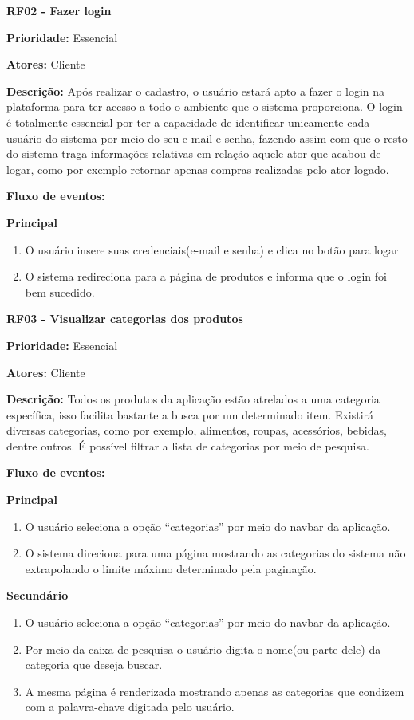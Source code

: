 \begin{apendicesenv}
\textbf{RF02 - Fazer login} \par
\textbf{Prioridade:} Essencial \par
\textbf{Atores:} Cliente \par
\textbf{Descrição:} Após realizar o cadastro, o usuário estará apto a fazer o login na plataforma para ter acesso a todo o ambiente que o sistema proporciona. O login é totalmente essencial por ter a capacidade de identificar unicamente cada usuário do sistema por meio do seu e-mail e senha, fazendo assim com que o resto do sistema traga informações relativas em relação aquele ator que acabou de logar, como por exemplo retornar apenas compras realizadas pelo ator logado. \par
\textbf{Fluxo de eventos:} \par
\textbf{Principal} \par
\begin{enumerate}
  \item O usuário insere suas credenciais(e-mail e senha) e clica no botão para logar
  \item O sistema redireciona para a página de produtos e informa que o login foi bem sucedido.
\end{enumerate}

\textbf{RF03 - Visualizar categorias dos produtos} \par
\textbf{Prioridade:} Essencial \par
\textbf{Atores:} Cliente \par
\textbf{Descrição:} Todos os produtos da aplicação estão atrelados a uma categoria específica, isso facilita bastante a busca por um determinado item. Existirá diversas categorias, como por exemplo, alimentos, roupas, acessórios, bebidas, dentre outros. É possível filtrar a lista de categorias por meio de pesquisa. \par
\textbf{Fluxo de eventos:} \par
\textbf{Principal} \par
\begin{enumerate}
  \item O usuário seleciona a opção “categorias” por meio do navbar da aplicação.
  \item O sistema direciona para uma página mostrando as categorias do sistema não extrapolando o limite máximo determinado pela paginação.
\end{enumerate} \par
\textbf{Secundário} \par
\begin{enumerate}
  \item O usuário seleciona a opção “categorias” por meio do navbar da aplicação.
  \item Por meio da caixa de pesquisa o usuário digita o nome(ou parte dele) da categoria que deseja buscar.
  \item A mesma página é renderizada mostrando apenas as categorias que condizem com a palavra-chave digitada pelo usuário.
\end{enumerate}


\end{apendicesenv}
